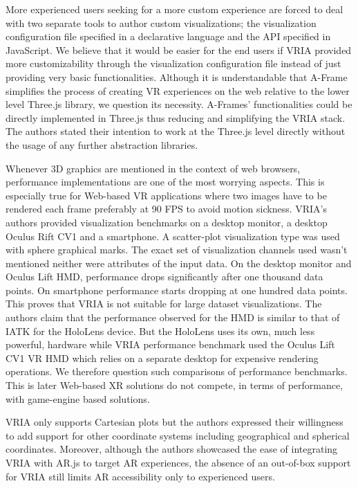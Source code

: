 \documentclass{vgtc}                          %
\begin{document}
\smallskip

\noindent More experienced users seeking for a more custom experience are
forced to deal with two separate tools to author custom visualizations;
the visualization configuration file specified in a declarative language and
the API specified in JavaScript. We believe that it would be easier for the end users if VRIA
provided more customizability through the visualization configuration file instead of just
providing very basic functionalities.
Although it is understandable that A-Frame simplifies the process of creating
VR experiences on the web relative to the lower level Three.js library, we
question its necessity. A-Frames' functionalities could be directly implemented
in Three.js thus reducing and simplifying the VRIA stack. The authors stated
their intention to work at the Three.js level directly without the usage of any further
abstraction libraries.

\smallskip

\noindent Whenever 3D graphics are mentioned in the context of web browsers,
performance implementations are one of the most worrying aspects. This is
especially true for Web-based VR applications where two images have to be
rendered each frame preferably at 90 FPS to avoid motion sickness. VRIA's
authors provided visualization benchmarks on a desktop monitor, a desktop
Oculus Rift CV1 and a smartphone. A scatter-plot visualization type was used
with sphere graphical marks. The exact set of visualization channels used
wasn't mentioned neither were attributes of the input data. On the desktop
monitor and Oculus Lift HMD, performance drops significantly after one
thousand data points. On smartphone performance starts dropping at one hundred
data points. This proves that VRIA is not suitable for large dataset
visualizations. The authors claim that the performance observed for the HMD
is similar to that of IATK for the HoloLens device. But the HoloLens uses
its own, much less powerful, hardware while VRIA performance benchmark used
the Oculus Lift CV1 VR HMD which relies on a separate desktop for expensive
rendering operations. We therefore question such comparisons of performance
benchmarks. This is later Web-based XR solutions do not compete,
in terms of performance, with game-engine based solutions.

\smallskip

\noindent VRIA only supports Cartesian plots but the authors expressed their
willingness to add support for other coordinate systems including geographical
and spherical coordinates.
Moreover, although the authors showcased the ease of integrating VRIA with
AR.js to target AR experiences, the absence of an out-of-box support for VRIA
still limits AR accessibility only to experienced users.
\end{document}
